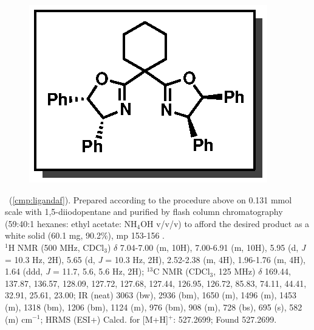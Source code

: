 \vspace{10pt}
\begin{figure}
  \vspace{-28pt}
  \begin{center}
    \includegraphics[scale=0.8]{chp_asymmetric/images/ligandaf}
  \end{center}
  \vspace{-30pt}
\end{figure}
\noindent \textbf{\CMPligandaf}\ (\ref{cmp:ligandaf}). Prepared according to the procedure above on
0.131 mmol scale with 1,5-diiodopentane and purified by flash column chromatography (59:40:1 hexanes: ethyl acetate: NH$_4$OH v/v/v) to afford the desired product as a
white solid (60.1 mg, 90.2\%), mp 153-156 \degc.\\
$^1$H NMR (500 MHz, CDCl$_3$) $\delta$ 7.04-7.00 (m, 10H), 7.00-6.91 (m, 10H), 5.95 (d, \textit{J} =
10.3 Hz, 2H), 5.65 (d, \textit{J} = 10.3 Hz, 2H), 2.52-2.38 (m, 4H), 1.96-1.76 (m, 4H), 1.64 (ddd,
\textit{J} = 11.7, 5.6, 5.6 Hz, 2H); $^{13}$C NMR (CDCl$_3$, 125 MHz) $\delta$ 169.44, 137.87,
136.57, 128.09, 127.72, 127.68, 127.44, 126.95, 126.72, 85.83, 74.11, 44.41, 32.91, 25.61, 23.00; IR
(neat) 3063 (bw), 2936 (bm), 1650 (m), 1496 (m), 1453 (m), 1318 (bm), 1206 (bm), 1124 (m), 976 (bm),
908 (m), 728 (bs), 695 (s), 582 (m) cm$^{-1}$; HRMS (ESI+) Calcd. for  [M+H]$^+$:
527.2699; Found 527.2699.

